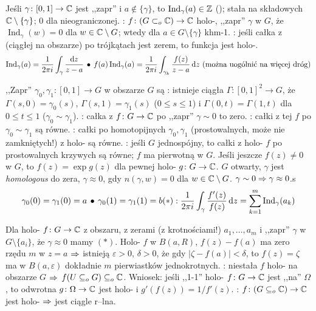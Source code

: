 Jeśli  $\gamma \colon [0,1] \to \mathbb{C}$ jest  ,,zapr'' i $a \not\in \{\gamma\}$, to $\operatorname{Ind}_\gamma(a) \in \mathbb{Z}$ (); stała na składowych $\mathbb{C} \setminus \{\gamma\}$; $0$ dla nieograniczonej.
: $f \colon (G \subset_o \mathbb{C}) \to \mathbb{C}$ holo-, ,,zapr'' $\gamma$ w $G$, że $\operatorname{Ind}_\gamma(w) = 0$ dla $w \in \mathbb{C} \setminus G$; wtedy dla $a \in G \setminus \{\gamma\}$ khm-1.
: jeśli całka z (ciągłej na obszarze) po trójkątach jest zerem, to funkcja jest holo-.
\[
	\operatorname{Ind}_\gamma(a)= \frac{1}{2\pi i} \int_\gamma \frac{\D z}{z-a} \spk
	f(a) \operatorname{Ind}_\gamma(a) = \frac{1}{2\pi i} \int_{\gamma_k} \frac{f(z)}{z-a} \,\D z \textrm{ (można uogólnić na więcej dróg)} %
\]

,,Zapr''  $\gamma_0, \gamma_1 \colon [0,1] \to G$ w obszarze $G$ są : istnieje ciągła $\Gamma \colon [0,1]^2 \to G$, że $\Gamma(s,0 ) = \gamma_0(s)$, $\Gamma(s,1)=  \gamma_1 (s)$ ($0 \le s \le 1$) i $\Gamma(0, t) = \Gamma(1,t)$ dla $0 \le t \le 1$ ($\gamma_0 \sim \gamma_1$).
: całka z $f \colon G\to \mathbb{C}$ po ,,zapr'' $\gamma \sim 0$ to zero.
: całki z tej $f$ po $\gamma_0 \sim \gamma_1$ są równe.
: całki po homotopijnych $\gamma_0, \gamma_1$ (prostowalnych, może nie zamkniętych!) z holo- są równe.
: jeśli $G$ jednospójny, to całki z holo- $f$ po prostowalnych krzywych są równe; $f$ ma pierwotną w $G$.
Jeśli jeszcze $f(z) \neq 0$ w $G$, to $f(z) = \exp g(z)$ dla pewnej holo- $g \colon G \to \mathbb{C}$.
$G$ otwarty, $\gamma$ jest \emph{homologous} do zera, $\gamma \approx 0$, gdy $n(\gamma, w) = 0$ dla $w \in \mathbb{C} \setminus G$.
$\gamma \sim 0 \Rightarrow \gamma \approx 0$.s
\[
	\gamma_0 (0) = \gamma_1 (0) = a \spk
	\gamma_0(1) = \gamma_1(1) = b
	\hfill
	(*): \frac{1}{2\pi i} \int_\gamma \frac{f'(z)}{f(z)} \,\D z = \sum_{k=1}^m \operatorname{Ind}_\gamma (a_k)
\]


Dla  holo- $f \colon G \to \mathbb{C}$ z obszaru, z zerami (z krotnościami!) $a_1, \dots, a_m$ i ,,zapr'' $\gamma$ w $G \setminus\{a_i\}$, że $\gamma \approx 0$ mamy $(*)$.
Holo- $f$ w $B(a, R)$, $f(z) - f(a)$ ma zero rzędu $m$ w $z = a$ $\Rightarrow$ istnieją $\varepsilon > 0$, $\delta > 0$, że gdy $|\zeta - f(a)| < \delta$, to $f(z) = \zeta$ ma w $B(a, \varepsilon)$ dokładnie $m$ pierwiastków jednokrotnych.
: niestała $f$ holo- na obszarze $G$ $\Rightarrow$ $f(U \subseteq_o G) \subseteq_o \mathbb{C}$.
Wniosek: jeśli ,,1-1'' holo- $f \colon G \to \mathbb{C}$ jest ,,na'' $\Omega$, to odwrotna $g \colon \Omega \to \mathbb{C}$ jest holo- i $g'(f(z)) = 1/f'(z)$.
: $f \colon (G \subseteq_o \mathbb{C}) \to \mathbb{C}$ jest holo- $\Rightarrow$ jest ciągle r--lna.